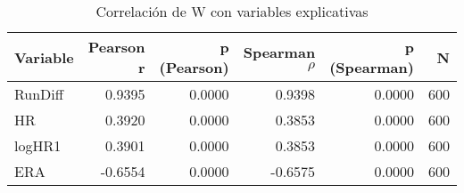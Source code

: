 \begin{table}
\caption{Correlación de W con variables explicativas}
\label{tab:corr_w_x}
\begin{tabular}{lrrrrr}
\toprule
Variable & Pearson r & p (Pearson) & Spearman $\rho$ & p (Spearman) & N \\
\midrule
RunDiff & 0.9395 & 0.0000 & 0.9398 & 0.0000 & 600 \\
HR & 0.3920 & 0.0000 & 0.3853 & 0.0000 & 600 \\
logHR1 & 0.3901 & 0.0000 & 0.3853 & 0.0000 & 600 \\
ERA & -0.6554 & 0.0000 & -0.6575 & 0.0000 & 600 \\
\bottomrule
\end{tabular}
\end{table}
